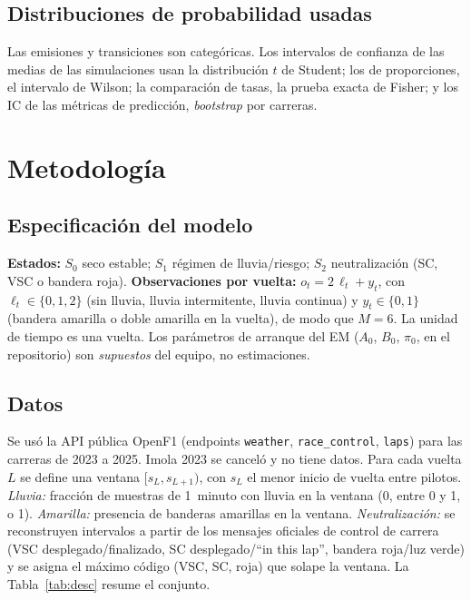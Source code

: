 \documentclass[11pt,letterpaper]{article}
\begin{document}
\subsection{Distribuciones de probabilidad usadas}
Las emisiones y transiciones son categóricas. Los intervalos de confianza de las medias de las simulaciones usan la distribución $t$ de Student; los de proporciones, el intervalo de Wilson; la comparación de tasas, la prueba exacta de Fisher; y los IC de las métricas de predicción, \emph{bootstrap} por carreras.

\section{Metodología}
\subsection{Especificación del modelo}
\textbf{Estados:} $S_0$ seco estable; $S_1$ régimen de lluvia/riesgo; $S_2$ neutralización (SC, VSC o bandera roja). \textbf{Observaciones por vuelta:} $o_t=2\,\ell_t+y_t$, con $\ell_t\in\{0,1,2\}$ (sin lluvia, lluvia intermitente, lluvia continua) y $y_t\in\{0,1\}$ (bandera amarilla o doble amarilla en la vuelta), de modo que $M=6$. La unidad de tiempo es una vuelta. Los parámetros de arranque del EM ($A_0$, $B_0$, $\pi_0$, en el repositorio) son \emph{supuestos} del equipo, no estimaciones.

\subsection{Datos}
Se usó la API pública OpenF1 (endpoints \texttt{weather}, \texttt{race\_control}, \texttt{laps}) para las carreras de 2023 a 2025. Imola 2023 se canceló y no tiene datos. Para cada vuelta $L$ se define una ventana $[s_L,s_{L+1})$, con $s_L$ el menor inicio de vuelta entre pilotos. \emph{Lluvia:} fracción de muestras de 1~minuto con lluvia en la ventana (0, entre 0 y 1, o 1). \emph{Amarilla:} presencia de banderas amarillas en la ventana. \emph{Neutralización:} se reconstruyen intervalos a partir de los mensajes oficiales de control de carrera (VSC desplegado/finalizado, SC desplegado/``in this lap'', bandera roja/luz verde) y se asigna el máximo código (VSC, SC, roja) que solape la ventana. La Tabla~\ref{tab:desc} resume el conjunto.

\begin{table}[ht]
\centering\small
\caption{Conjunto de datos reales por temporada.}
\label{tab:desc}

\end{table}
\end{document}
